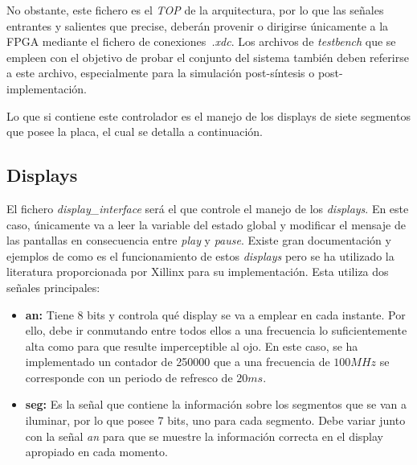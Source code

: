 No obstante, este fichero es el \emph{TOP} de la arquitectura, por lo que las señales entrantes y salientes que precise, deberán provenir o dirigirse únicamente a la FPGA mediante el fichero de conexiones~\emph{.xdc}. Los archivos de \emph{testbench} que se empleen con el objetivo de probar el conjunto del sistema también deben referirse a este archivo, especialmente para la simulación post-síntesis o post-implementación.

Lo que si contiene este controlador es el manejo de los displays de siete segmentos que posee la placa, el cual se detalla a continuación.

\subsection{Displays}
El fichero \emph{display\_interface} será el que controle el manejo de los \emph{displays}. En este caso, únicamente va a leer la variable del estado global y modificar el mensaje de las pantallas en consecuencia entre \emph{play} y \emph{pause}. Existe gran documentación y ejemplos de como es el funcionamiento de estos \emph{displays} pero se ha utilizado la literatura proporcionada por Xillinx \cite{Nexys} para su implementación. Esta utiliza dos señales principales:
\begin{itemize}
\item \textbf{an:} Tiene 8 bits y controla qué display se va a emplear en cada instante. Por ello, debe ir conmutando entre todos ellos a una frecuencia lo suficientemente alta como para que resulte imperceptible al ojo. En este caso, se ha implementado un contador de 250000 que a una frecuencia de $100 MHz$ se corresponde con un periodo de refresco de $20 ms$.
\item \textbf{seg:} Es la señal que contiene la información sobre los segmentos que se van a iluminar, por lo que posee 7 bits, uno para cada segmento. Debe variar junto con la señal \emph{an} para que se muestre la información correcta en el display apropiado en cada momento.
\end{itemize}

